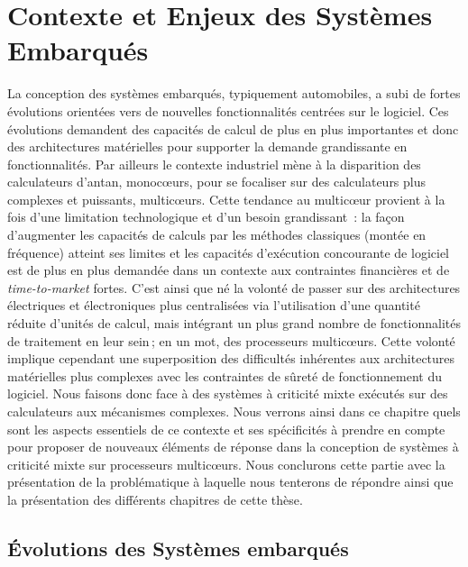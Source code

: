 \documentclass[french, a4paper, 11pt, twoside, pdftex]{StyleThese}
\begin{document}
\setcounter{chapter}{1}
\dominitoc
\faketableofcontents
\fi

\chapter{Contexte et Enjeux des Systèmes Embarqués} \label{chap:1_EnjeuxIntro}
\minitoc

La conception des systèmes embarqués, typiquement automobiles, a subi de fortes évolutions orientées vers de nouvelles fonctionnalités centrées sur le logiciel. Ces évolutions demandent des capacités de calcul de plus en plus importantes et donc des architectures matérielles pour supporter la demande grandissante en fonctionnalités. Par ailleurs le contexte industriel mène à la disparition des calculateurs d'antan, monocœurs, pour se focaliser sur des calculateurs plus complexes et puissants, multicœurs. Cette tendance au multicœur provient à la fois d'une limitation technologique et d'un besoin grandissant~: la façon d'augmenter les capacités de calculs par les méthodes classiques (montée en fréquence) atteint ses limites et les capacités d'exécution concourante de logiciel est de plus en plus demandée dans un contexte aux contraintes financières et de \textit{time-to-market} fortes. C'est ainsi que né la volonté de passer sur des architectures électriques et électroniques plus centralisées via l'utilisation d'une quantité réduite d'unités de calcul, mais intégrant un plus grand nombre de fonctionnalités de traitement en leur sein ; en un mot, des processeurs multicœurs. Cette volonté implique cependant une superposition des difficultés inhérentes aux architectures matérielles plus complexes avec les contraintes de sûreté de fonctionnement du logiciel. Nous faisons donc face à des systèmes à criticité mixte exécutés sur des calculateurs aux mécanismes complexes. Nous verrons ainsi dans ce chapitre quels sont les aspects essentiels de ce contexte et ses spécificités à prendre en compte pour proposer de nouveaux éléments de réponse dans la conception de systèmes à criticité mixte sur processeurs multicœurs. Nous conclurons cette partie avec la présentation de la problématique à laquelle nous tenterons de répondre ainsi que la présentation des différents chapitres de cette thèse.

\section{Évolutions des Systèmes embarqués}
\end{document}

